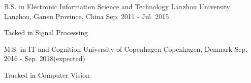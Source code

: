 \begin{cventries}
  \cventry
    {B.S. in Electronic Information Science and Technology}
	{Lanzhou University}
    {Lanzhou, Gansu Province, China}
    {Sep. 2011 - Jul. 2015}
    {
      \begin{cvitems}
        \item {Tacked in Signal Processing}
      \end{cvitems}
    }
\end{cventries}
\begin{cventries}
  \cventry
    {M.S. in IT and Cognition}
	{University of Copenhagen}
    {Copenhagen, Denmark}
    {Sep. 2016 - Sep. 2018(expected)}
    {
      \begin{cvitems}
        \item {Tracked in Computer Vision}
      \end{cvitems}
    }
\end{cventries}
